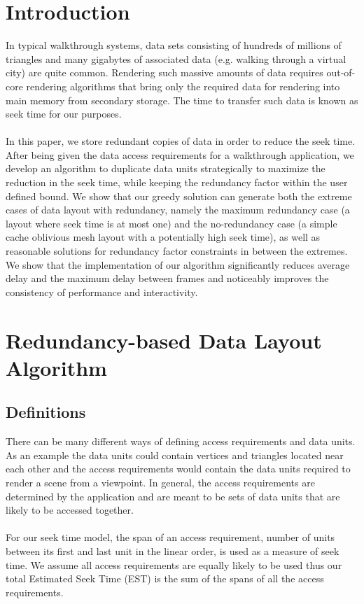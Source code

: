 
\section{Introduction}

In typical walkthrough systems, data sets consisting of hundreds of millions of
triangles and many gigabytes of associated data (e.g. walking through a virtual
city) are quite common. Rendering such massive amounts of data requires
out-of-core rendering algorithms that bring only the required data for
rendering into main memory from secondary storage. The time to transfer such data
is known as seek time for our purposes. \\
\\
In this paper, we store redundant
copies of data in order to reduce the seek time. After being given
the data access requirements for a walkthrough application, we develop
an algorithm to duplicate data units strategically to maximize the reduction
in the seek time, while keeping the redundancy factor within the user defined
bound. We show that our greedy solution can generate both the extreme cases
of data layout with redundancy, namely the maximum redundancy case
(a layout where seek time is at most one) and the no-redundancy case (a simple
cache oblivious mesh layout with a potentially high seek time), as well as
reasonable solutions for redundancy factor constraints in between the extremes.
We show that the
implementation of our algorithm significantly reduces average delay and the maximum delay between
frames and noticeably improves the consistency of performance and
interactivity.

\section{Redundancy-based Data Layout Algorithm}

\subsection{Definitions}

There can be many different ways of defining access requirements and data
units. As an example the data units could contain vertices and triangles located near each other and the access requirements would contain the data units required to render a scene from a viewpoint. In general,
the access requirements are determined by the application and are meant to be
sets of data units that are likely to be accessed together. \\
\\
For our seek time model, the
span of an access requirement, number of units between its first and last unit in the linear order, is used as a measure of seek time.
 We assume all access requirements are equally likely to be used thus 
our total Estimated Seek Time (EST) is the sum of the spans of all the access requirements. 


